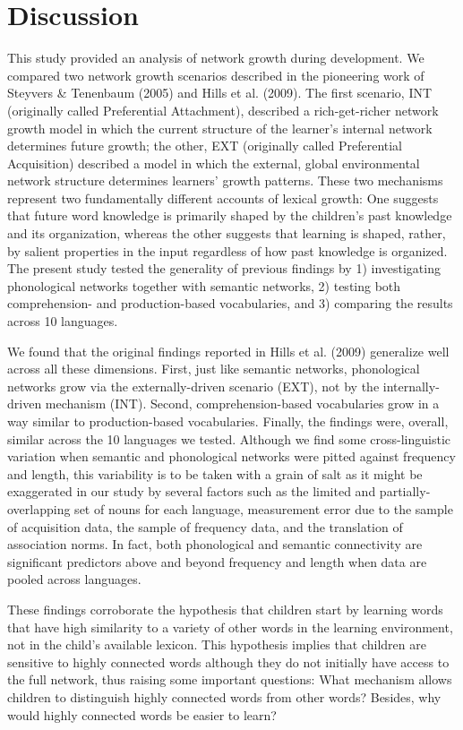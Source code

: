 \documentclass[english,,man,floatsintext]{apa6}
\begin{document}
\hypertarget{discussion}{%
\section{Discussion}\label{discussion}}

This study provided an analysis of network growth during development. We compared two network growth scenarios described in the pioneering work of Steyvers \& Tenenbaum (2005) and Hills et al. (2009). The first scenario, INT (originally called Preferential Attachment), described a rich-get-richer network growth model in which the current structure of the learner's internal network determines future growth; the other, EXT (originally called Preferential Acquisition) described a model in which the external, global environmental network structure determines learners' growth patterns. These two mechanisms represent two fundamentally different accounts of lexical growth: One suggests that future word knowledge is primarily shaped by the children's past knowledge and its organization, whereas the other suggests that learning is shaped, rather, by salient properties in the input regardless of how past knowledge is organized. The present study tested the generality of previous findings by 1) investigating phonological networks together with semantic networks, 2) testing both comprehension- and production-based vocabularies, and 3) comparing the results across 10 languages.

We found that the original findings reported in Hills et al. (2009) generalize well across all these dimensions. First, just like semantic networks, phonological networks grow via the externally-driven scenario (EXT), not by the internally-driven mechanism (INT). Second, comprehension-based vocabularies grow in a way similar to production-based vocabularies. Finally, the findings were, overall, similar across the 10 languages we tested. Although we find some cross-linguistic variation when semantic and phonological networks were pitted against frequency and length, this variability is to be taken with a grain of salt as it might be exaggerated in our study by several factors such as the limited and partially-overlapping set of nouns for each language, measurement error due to the sample of acquisition data, the sample of frequency data, and the translation of association norms. In fact, both phonological and semantic connectivity are significant predictors above and beyond frequency and length when data are pooled across languages.

These findings corroborate the hypothesis that children start by learning words that have high similarity to a variety of other words in the learning environment, not in the child's available lexicon. This hypothesis implies that children are sensitive to highly connected words although they do not initially have access to the full network, thus raising some important questions: What mechanism allows children to distinguish highly connected words from other words? Besides, why would highly connected words be easier to learn?
\end{document}
